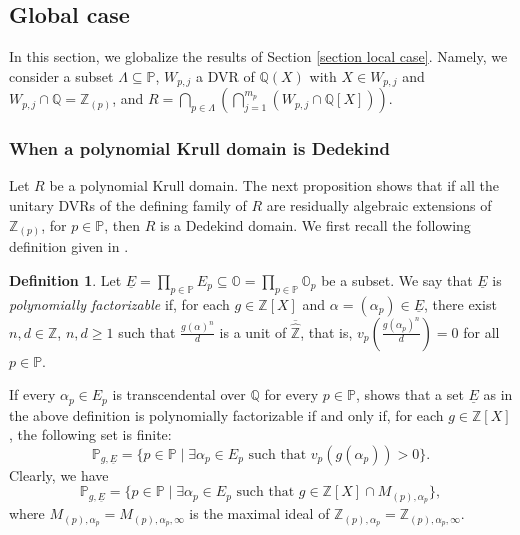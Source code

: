 \documentclass[10pt]{article}
\numberwithin{equation}{section}
\theoremstyle{definition}
\newtheorem{Def}[equation]{Definition}
\theoremstyle{definition}
\newcommand{\Q}{\mathbb{Q}}
\newcommand{\Z}{\mathbb{Z}}
\renewcommand{\O}{\mathbb{O}}
\newcommand{\PP}{\mathbb{P}}
\newcommand{\uE}{\underline{E}}
\newcommand{\hZ}{\widehat{\mathbb{Z}}}
\newcommand{\ohZ}{\overline{\hZ}}
\begin{document}
\subsection{Global case}\label{section global case}

In this section, we globalize the results of Section \ref{section local case}. Namely, we consider a subset $\Lambda \subseteq \PP$, $W_{p, j}$ a DVR
of $\mathbb{Q}(X)$ with $X \in W_{p,j}$ and $W_{p,j} \cap \mathbb{Q} = \mathbb{Z}_{(p)}$,
and $R= \bigcap\limits_{p \in \Lambda}(\bigcap\limits_{j=1}^{m_p}(W_{p,j} \cap \mathbb{Q}[X]))$. 

\subsubsection{When a polynomial Krull domain is Dedekind}


Let  $R$ be a polynomial Krull domain. The next proposition shows that if all the unitary DVRs of the defining family of $R$ are residually algebraic extensions of $\Z_{(p)}$, for $p\in\PP$, then $R$ is a Dedekind domain. We first recall the following definition given in \cite{PerDedekind,PerStacked}.

\begin{Def}
Let $\uE=\prod\limits_{p\in\PP}E_p\subseteq\O=\prod_{p\in\PP}\O_p$ be a subset.
We say that $\uE$ is \emph{polynomially factorizable} if, for each $g\in\Z[X]$ and $\alpha=(\alpha_p)\in\uE$, there exist $n,d\in\Z$, $n,d\geq 1$ such that $\frac{g(\alpha)^n}{d}$ is a unit of $\ohZ$, that is, $v_p(\frac{g(\alpha_p)^n}{d})=0$ for all $p\in\PP$.
\end{Def}

If every $\alpha_p\in E_p$ is transcendental over $\Q$ for every $p\in\PP$, \cite[Lemma 2.12]{PerDedekind} shows that a set $\uE$ as in the above definition is polynomially factorizable if and only if, for each $g\in\Z[X]$, the following set is finite:
$$\PP_{g,\uE}=\{p\in\PP\mid\exists \alpha_p\in E_p \text{ such that }v_p(g(\alpha_p))>0\}.$$
Clearly, we have
$$\PP_{g,\uE}=\{p\in\PP\mid\exists \alpha_p\in E_p \text{ such that }g\in\Z[X]\cap M_{(p),\alpha_p}\},$$
where $M_{(p),\alpha_p}=M_{(p),\alpha_p,\infty}$ is the maximal ideal of $\Z_{(p),\alpha_p}=\Z_{(p),\alpha_p,\infty}$.
\end{document}
